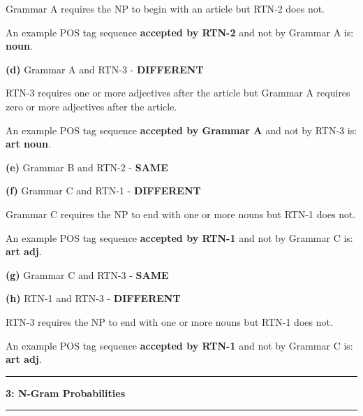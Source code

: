 \documentclass[11pt]{article}
\newcommand\question[2]{\vspace{.25in}\hrule\textbf{#1: #2}\vspace{.5em}\hrule\vspace{.10in}}
\renewcommand\part[1]{\vspace{.10in}\textbf{(#1)}}
\begin{document}
Grammar A requires the NP to begin with an article but RTN-2 does not.

An example POS tag sequence \textbf{accepted by RTN-2} and not by Grammar A is: \textbf{noun}.\newline

\part{d} Grammar A and RTN-3 - \textbf{DIFFERENT}

RTN-3 requires one or more adjectives after the article but Grammar A requires zero or more adjectives after the article.

An example POS tag sequence \textbf{accepted by Grammar A} and not by RTN-3 is: \textbf{art noun}.\newline

\part{e} Grammar B and RTN-2 - \textbf{SAME}\newline

\part{f} Grammar C and RTN-1 - \textbf{DIFFERENT}

Grammar C requires the NP to end with one or more nouns but RTN-1 does not.

An example POS tag sequence \textbf{accepted by RTN-1} and not by Grammar C is: \textbf{art adj}.\newline

\part{g} Grammar C and RTN-3 - \textbf{SAME}\newline

\part{h} RTN-1 and RTN-3 - \textbf{DIFFERENT}

RTN-3 requires the NP to end with one or more nouns but RTN-1 does not.

An example POS tag sequence \textbf{accepted by RTN-1} and not by Grammar C is: \textbf{art adj}.

\newpage

\question{3}{N-Gram Probabilities}
\end{document}
